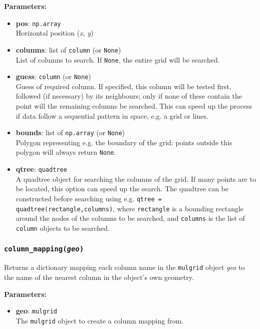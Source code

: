 \textbf{Parameters:}
\begin{itemize}
\item \textbf{pos}: \texttt{np.array}\\
  Horizontal position (\emph{x}, \emph{y})
\item \textbf{columns}: list of \texttt{column} (or \texttt{None})\\
  List of columns to search.  If \texttt{None}, the entire grid will be searched.
\item \textbf{guess}: \texttt{column} (or \texttt{None})\\
  Guess of required column.  If specified, this column will be tested first, followed (if necessary) by its neighbours; only if none of these contain the point will the remaining columns be searched.  This can speed up the process if data follow a sequential pattern in space, e.g. a grid or lines.
 \item \textbf{bounds}: list of \texttt{np.array} (or \texttt{None})\\
  Polygon representing e.g. the boundary of the grid: points outside this polygon will always return \texttt{None}.
 \item \textbf{qtree}: \texttt{quadtree} \\
   A quadtree object for searching the columns of the grid.  If many points are to be located, this option can speed up the search.  The quadtree can be constructed before searching using e.g. \texttt{qtree = quadtree(rectangle,columns)}, where \texttt{rectangle} is a bounding rectangle around the nodes of the columns to be searched, and \texttt{columns} is the list of \texttt{column} objects to be searched.
\end{itemize}

\subsubsection{\texttt{column\_mapping(\emph{geo})}}

Returns a dictionary mapping each column name in the \texttt{mulgrid} object \emph{geo} to the name of the nearest column in the object's own geometry.

\textbf{Parameters:}
\begin{itemize}
\item \textbf{geo}: \texttt{mulgrid}\\
  The \texttt{mulgrid} object to create a column mapping from.
\end{itemize}

